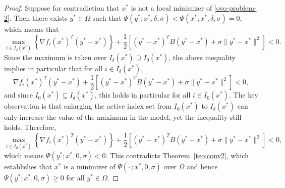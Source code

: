 \documentclass[11pt]{article}
\newcommand{\R}{\mathbb{R}}
\newcommand{\simplex}{\textstyle\sum}
\begin{document}
\begin{proof}
Suppose for contradiction that $x^*$ is not a local minimizer of 
\eqref{ovo-problem-2}. Then there exists $y^* \in \Omega$ such that 
$\Psi(y^*; x^*, \delta, \sigma) < \Psi(x^*; x^*, \delta, \sigma) = 0$, 
which means that
\begin{equation*}
    \max_{i \in I_\delta(x^*)} \left\{ \nabla f_i(x^*)^T(y^* - x^*) 
    \right\} + \frac{1}{2}\left[(y^* - x^*)^T B (y^* - x^*) 
    + \sigma \|y^* - x^*\|^2\right] < 0.
\end{equation*}
Since the maximum is taken over $I_\delta(x^*) \supseteq I_0(x^*)$, 
the above inequality implies in particular that for all 
$i \in I_\delta(x^*)$,
\begin{equation*}
    \nabla f_i(x^*)^T(y^* - x^*) + \frac{1}{2}\left[(y^* - x^*)^T 
    B (y^* - x^*) + \sigma \|y^* - x^*\|^2\right] < 0,
\end{equation*}
and since $I_0(x^*) \subseteq I_\delta(x^*)$, this holds in 
particular for all $i \in I_0(x^*)$. The key observation is that 
enlarging the active index set from $I_0(x^*)$ to $I_\delta(x^*)$ 
can only increase the value of the maximum in the model, yet the 
inequality still holds. Therefore,
\begin{equation*}
    \max_{i \in I_0(x^*)} \left\{ \nabla f_i(x^*)^T(y^* - x^*) 
    \right\} + \frac{1}{2}\left[(y^* - x^*)^T B (y^* - x^*) 
    + \sigma \|y^* - x^*\|^2\right] < 0,
\end{equation*}
which means $\Psi(y^*; x^*, 0, \sigma) < 0$. This contradicts 
Theorem~\ref{teo:conv2}, which establishes that $x^*$ is a minimizer 
of $\Psi(\cdot\,; x^*, 0, \sigma)$ over $\Omega$ and hence 
$\Psi(y^*; x^*, 0, \sigma) \geq 0$ for all $y^* \in \Omega$.
\end{proof}

\end{document}
